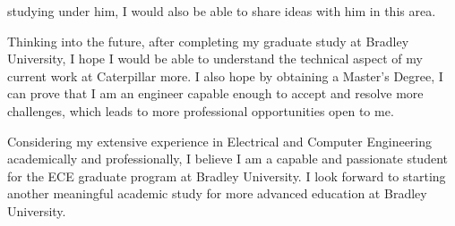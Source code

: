 \documentclass[a4paper]{article}
\begin{document}
studying under him, I would also be able to share ideas with him in this area.
\par Thinking into the future, after completing my graduate study at Bradley
University, I hope I would be able to understand the technical aspect of my
current work at Caterpillar more.
I also hope by obtaining a Master's Degree, I can prove that I am an engineer
capable enough to accept and resolve more challenges, which leads to more
professional opportunities open to me.
\par Considering my extensive experience in Electrical and Computer Engineering
academically and professionally, I believe I am a capable and passionate student
for the ECE graduate program at Bradley University.
I look forward to starting another meaningful academic study for more advanced
education at Bradley University.
\end{document}
